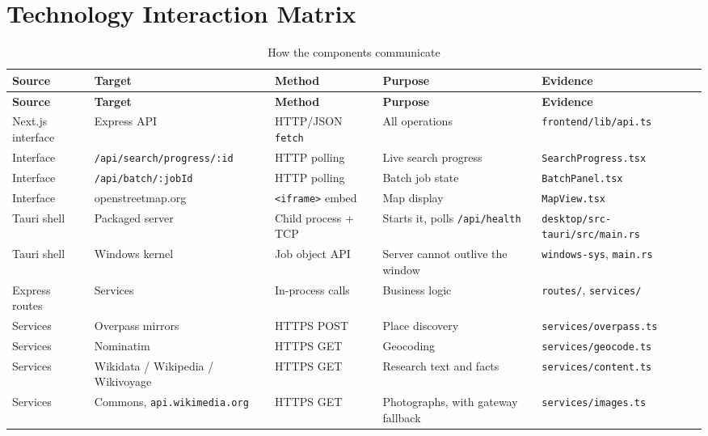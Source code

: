 \documentclass[11pt,a4paper]{report}
\newcommand{\code}[1]{\texttt{\small #1}}
\DeclareRobustCommand{\file}[1]{{\small\nolinkurl{#1}}}
\begin{document}
\chapter{Technology Interaction Matrix}
\label{sec:matrix}

\begin{longtable}{@{}>{\raggedright\arraybackslash}p{3.0cm}>{\raggedright\arraybackslash}p{3.0cm}>{\raggedright\arraybackslash}p{2.6cm}>{\raggedright\arraybackslash}p{3.0cm}>{\raggedright\arraybackslash}p{3.2cm}@{}}
\caption{How the components communicate}\label{tab:matrix}\\
\toprule
\textbf{Source} & \textbf{Target} & \textbf{Method} & \textbf{Purpose} & \textbf{Evidence}\\
\midrule
\endfirsthead
\toprule
\textbf{Source} & \textbf{Target} & \textbf{Method} & \textbf{Purpose} & \textbf{Evidence}\\
\midrule
\endhead
\bottomrule
\endfoot
Next.js interface & Express API & HTTP/JSON \code{fetch} & All operations & \file{frontend/lib/api.ts}\\
Interface & \file{/api/search/progress/:id} & HTTP polling & Live search progress & \file{SearchProgress.tsx}\\
Interface & \file{/api/batch/:jobId} & HTTP polling & Batch job state & \file{BatchPanel.tsx}\\
Interface & openstreetmap.org & \code{<iframe>} embed & Map display & \file{MapView.tsx}\\
Tauri shell & Packaged server & Child process + TCP & Starts it, polls \file{/api/health} & \file{desktop/src-tauri/src/main.rs}\\
Tauri shell & Windows kernel & Job object API & Server cannot outlive the window & \code{windows-sys}, \file{main.rs}\\
Express routes & Services & In-process calls & Business logic & \file{routes/}, \file{services/}\\
Services & Overpass mirrors & HTTPS POST & Place discovery & \file{services/overpass.ts}\\
Services & Nominatim & HTTPS GET & Geocoding & \file{services/geocode.ts}\\
Services & Wikidata / Wikipedia / Wikivoyage & HTTPS GET & Research text and facts & \file{services/content.ts}\\
Services & Commons, \code{api.wikimedia.org} & HTTPS GET & Photographs, with gateway fallback & \file{services/images.ts}\\

\end{longtable}
\end{document}
